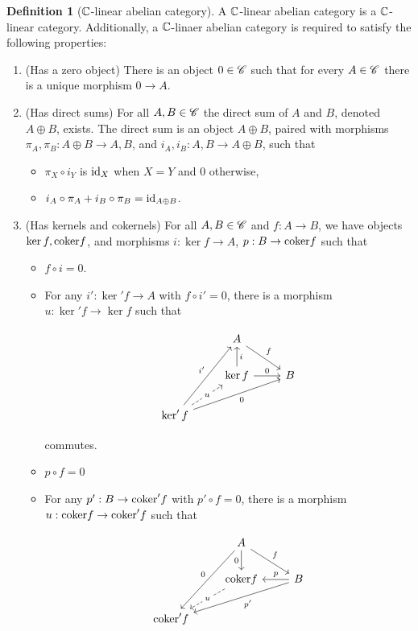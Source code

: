\documentclass{article}
\theoremstyle{definition}
\newtheorem*{definition}{Definition}
\numberwithin{figure}{section}
\begin{document}
\begin{definition}[$\mathbb{C}$-linear abelian category] A $\mathbb{C}$-linear abelian category is a $\mathbb{C}$-linear category. Additionally, a $\mathbb{C}$-linaer abelian category is required to satisfy the following properties:

\begin{enumerate}
\item (Has a zero object) There is an object $0\in \mathscr{C}$ such that for every $A\in \mathscr{C}$ there is a unique morphism $0\to A$.
\item (Has direct sums) For all $A,B\in \mathscr{C}$ the direct sum of $A$ and $B$, denoted $A\oplus B$, exists. The direct sum is an object $A\oplus B$, paired with morphisms $\pi_{A},\pi_{B}: A\oplus B\to A,B$, and $i_{A},i_{B}: A,B\to A\oplus B$, such that

\begin{itemize}
\item $\pi_{X}\circ i_{Y}$ is $\mathrm{id}_X$ when $X=Y$ and $0$ otherwise,
\item $i_{A}\circ \pi_{A}+i_{B}\circ \pi_{B}=\mathrm{id}_{A\oplus B}$.
\end{itemize}
\item (Has kernels and cokernels) For all $A,B\in \mathscr{C}$ and $f:A\to B$, we have objects $\ker f, \mathrm{coker} f$, and morphisms $i:\ker f\to A$, $p: B\to \mathrm{coker} f$ such that

\begin{itemize}
\item $f\circ i=0$.
\item For any $i': \ker' f\to A$ with $f\circ i'=0$, there is a morphism $u: \ker'f\to \ker f$ such that

\[\begin{tikzcd}
	& A \\
	& {\ker f} & B \\
	{\ker' f}
	\arrow["f", from=1-2, to=2-3]
	\arrow["{i'}", from=3-1, to=1-2]
	\arrow["0"', from=3-1, to=2-3]
	\arrow["i"', from=2-2, to=1-2]
	\arrow["0", from=2-2, to=2-3]
	\arrow["u"{description}, dashed, from=3-1, to=2-2]
\end{tikzcd}\]

commutes.

\item $p\circ f=0$
\item For any $p':B\to \mathrm{coker}' f$ with $p'\circ f=0$, there is a morphism $u: \mathrm{coker} f\to \mathrm{coker}' f$ such that

\[\begin{tikzcd}
	& A \\
	& {\coker f} & B \\
	{\coker' f}
	\arrow["f", from=1-2, to=2-3]
	\arrow["0"', from=1-2, to=3-1]
	\arrow["{p'}", from=2-3, to=3-1]
	\arrow["0"', from=1-2, to=2-2]
	\arrow["p"', from=2-3, to=2-2]
	\arrow["u"{description}, dashed, from=2-2, to=3-1]
\end{tikzcd}\]


\end{itemize}
\end{enumerate}
\end{definition}
\end{document}
